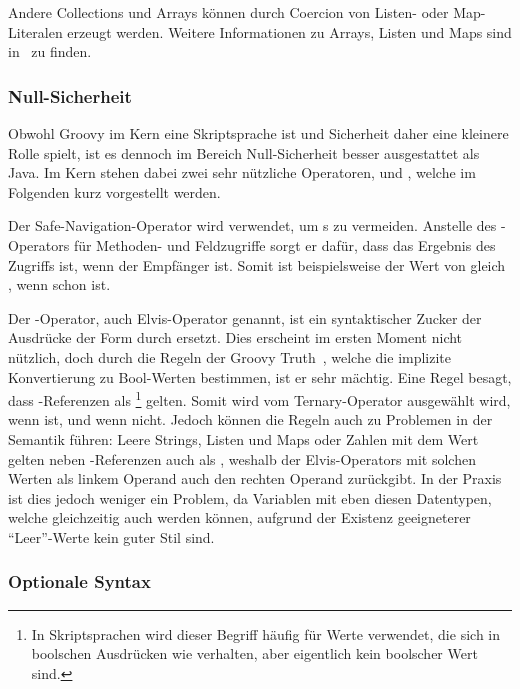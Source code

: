 Andere Collections und Arrays können durch Coercion von Listen- oder Map-Literalen erzeugt werden.
Weitere Informationen zu Arrays, Listen und Maps sind in~\cite[{Abs.} 7.-9.]{groovy-lang:syntax} zu finden.

\subsubsection{Null-Sicherheit}

Obwohl Groovy im Kern eine Skriptsprache ist und Sicherheit daher eine kleinere Rolle spielt, ist es dennoch im Bereich Null-Sicherheit besser ausgestattet als Java.
Im Kern stehen dabei zwei sehr nützliche Operatoren,  und , welche im Folgenden kurz vorgestellt werden.

Der Safe-Navigation-Operator  wird verwendet, um s zu vermeiden.
Anstelle des -Operators für Methoden- und Feldzugriffe sorgt er dafür, dass das Ergebnis des Zugriffs  ist, wenn der Empfänger  ist.
Somit ist beispielsweise der Wert von  gleich , wenn  schon  ist.

Der -Operator, auch Elvis-Operator genannt, ist ein syntaktischer Zucker der Ausdrücke der Form  durch  ersetzt.
Dies erscheint im ersten Moment nicht nützlich, doch durch die Regeln der Groovy Truth~\cite[{Abs.} 5.]{groovy-lang:semantics}, welche die implizite Konvertierung zu Bool-Werten bestimmen, ist er sehr mächtig.
Eine Regel besagt, dass -Referenzen als \footnote{In Skriptsprachen wird dieser Begriff häufig für Werte verwendet, die sich in boolschen Ausdrücken wie  verhalten, aber eigentlich kein boolscher Wert sind.} gelten.
Somit wird  vom Ternary-Operator ausgewählt wird, wenn   ist, und  wenn nicht.
Jedoch können die Regeln auch zu Problemen in der Semantik führen:
Leere Strings, Listen und Maps oder Zahlen mit dem Wert  gelten neben -Referenzen auch als , weshalb der Elvis-Operators mit solchen Werten als linkem Operand auch den rechten Operand zurückgibt.
In der Praxis ist dies jedoch weniger ein Problem, da Variablen mit eben diesen Datentypen, welche gleichzeitig auch  werden können, aufgrund der Existenz geeigneterer ``Leer''-Werte kein guter Stil sind.

\subsubsection{Optionale Syntax}\label{subsubsec:optionale-syntax}

